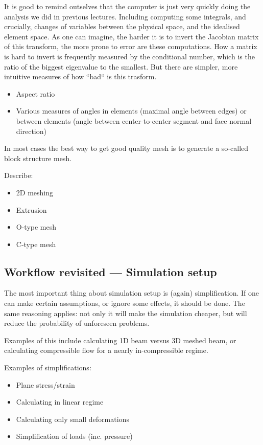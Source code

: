 \documentclass[12pt]{article}
\begin{document}
It is good to remind outselves that the computer is just very quickly doing the analysis we did in previous lectures. Including computing some integrals, and crucially, changes of variables between the physical space, and the idealised element space. As one can imagine, the harder it is to invert the Jacobian matrix of this transform, the more prone to error are these computations. How a matrix is hard to invert is frequently measured by the conditional number, which is the ratio of the biggest eigenvalue to the smallest. But there are simpler, more intuitive measures of how ``bad`` is this trasform.
\begin{itemize}
    \item Aspect ratio
    \item Various measures of angles in elements (maximal angle between edges) or between elements (angle between center-to-center segment and face normal direction)
\end{itemize}
In most cases the best way to get good quality mesh is to generate a so-called block structure mesh.

Describe:
\begin{itemize}
    \item 2D meshing
    \item Extrusion
    \item O-type mesh
    \item C-type mesh
\end{itemize}

\subsection{Workflow revisited --- Simulation setup}
The most important thing about simulation setup is (again) simplification. If one can make certain assumptions, or ignore some effects, it should be done. The same reasoning applies: not only it will make the simulation cheaper, but will reduce the probability of unforeseen problems.

Examples of this include calculating 1D beam versus 3D meshed beam, or calculating compressible flow for a nearly in-compressible regime.

Examples of simplifications:
\begin{itemize}
    \item Plane stress/strain
    \item Calculating in linear regime
    \item Calculating only small deformations
    \item Simplification of loads (inc. pressure)
\end{itemize}
\end{document}
